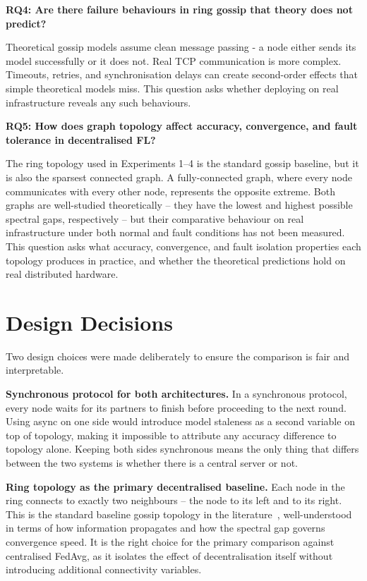 \documentclass[12pt]{report}
\begin{document}
\textbf{RQ4: Are there failure behaviours in ring gossip that theory does not
predict?}

Theoretical gossip models assume clean message passing - a node either sends
its model successfully or it does not. Real TCP communication is more complex.
Timeouts, retries, and synchronisation delays can create second-order effects
that simple theoretical models miss. This question asks whether deploying on
real infrastructure reveals any such behaviours.

\textbf{RQ5: How does graph topology affect accuracy, convergence, and fault
tolerance in decentralised FL?}

The ring topology used in Experiments 1--4 is the standard gossip baseline,
but it is also the sparsest connected graph. A fully-connected graph, where
every node communicates with every other node, represents the opposite extreme.
Both graphs are well-studied theoretically -- they have the lowest and highest
possible spectral gaps, respectively -- but their comparative behaviour on real
infrastructure under both normal and fault conditions has not been measured.
This question asks what accuracy, convergence, and fault isolation properties
each topology produces in practice, and whether the theoretical predictions
hold on real distributed hardware.

\section{Design Decisions}

Two design choices were made deliberately to ensure the comparison is fair and
interpretable.

\textbf{Synchronous protocol for both architectures.} In a synchronous protocol,
every node waits for its partners to finish before proceeding to the next round.
Using async on one side would introduce model staleness as a second variable on
top of topology, making it impossible to attribute any accuracy difference to
topology alone. Keeping both sides synchronous means the only thing that differs
between the two systems is whether there is a central server or not.

\textbf{Ring topology as the primary decentralised baseline.} Each node in the
ring connects to exactly two neighbours -- the node to its left and to its right.
This is the standard baseline gossip topology in the literature~\cite{boyd2006},
well-understood in terms of how information propagates and how the spectral gap
governs convergence speed. It is the right choice for the primary comparison
against centralised FedAvg, as it isolates the effect of decentralisation itself
without introducing additional connectivity variables.
\end{document}

